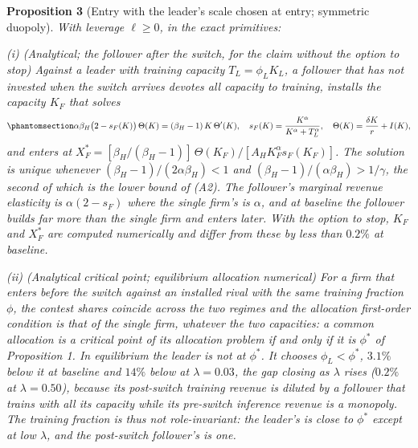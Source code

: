 \documentclass[
  11pt,
  letterpaper,
]{scrartcl}
\begin{document}
\textbf{Proposition 3} (Entry with the leader's scale chosen at entry;
symmetric duopoly). \emph{With leverage \(\ell \geq 0\), in the exact
primitives:}

\emph{(i) (Analytical; the follower after the switch, for the claim
without the option to stop) Against a leader with training capacity
\(T_L = \phi_L K_L\), a follower that has not invested when the switch
arrives devotes all capacity to training, installs the capacity \(K_F\)
that solves}
\begin{equation}\protect\phantomsection\label{eq-follower-foc}{
\alpha \beta_H \bigl(2 - s_F(K)\bigr)\,\Theta(K) = (\beta_H - 1)\,K\,\Theta'(K), \quad s_F(K) = \frac{K^\alpha}{K^\alpha + T_L^\alpha}, \quad \Theta(K) = \frac{\delta K}{r} + I(K),
}\end{equation} \emph{and enters at
\(X_F^* = [\beta_H/(\beta_H - 1)]\,\Theta(K_F)/[A_H K_F^\alpha s_F(K_F)]\).
The solution is unique whenever \((\beta_H - 1)/(2\alpha\beta_H) < 1\)
and \((\beta_H - 1)/(\alpha\beta_H) > 1/\gamma\), the second of which is
the lower bound of (A2). The follower's marginal revenue elasticity is
\(\alpha(2 - s_F)\) where the single firm's is \(\alpha\), and at
baseline the follower builds far more than the single firm and enters
later. With the option to stop, \(K_F\) and \(X_F^*\) are computed
numerically and differ from these by less than \(0.2\%\) at baseline.}

\emph{(ii) (Analytical critical point; equilibrium allocation numerical)
For a firm that enters before the switch against an installed rival with
the same training fraction \(\phi\), the contest shares coincide across
the two regimes and the allocation first-order condition is that of the
single firm, whatever the two capacities: a common allocation is a
critical point of its allocation problem if and only if it is \(\phi^*\)
of Proposition 1. In equilibrium the leader is not at \(\phi^*\). It
chooses \(\phi_L < \phi^*\), \(3.1\%\) below it at baseline and \(14\%\)
below at \(\lambda = 0.03\), the gap closing as \(\lambda\) rises
(\(0.2\%\) at \(\lambda = 0.50\)), because its post-switch training
revenue is diluted by a follower that trains with all its capacity while
its pre-switch inference revenue is a monopoly. The training fraction is
thus not role-invariant: the leader's is close to \(\phi^*\) except at
low \(\lambda\), and the post-switch follower's is one.}
\end{document}
